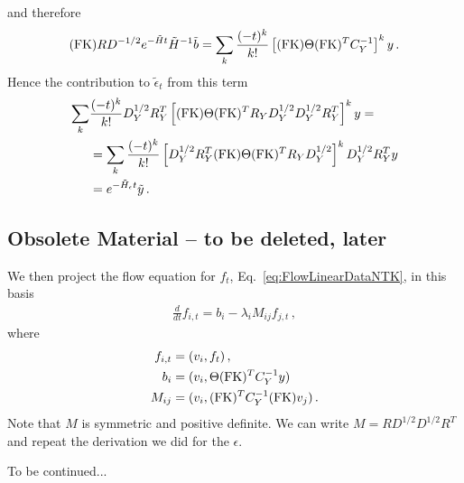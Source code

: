 \documentclass[11pt]{article}
\begin{document}
and therefore 
\begin{align}
    (\mathrm{FK}) R D^{-1/2} e^{-\tilde{H}t} \tilde{H}^{-1} \tilde{b} = 
        \sum_k \frac{(-t)^k}{k!} \left[(\mathrm{FK}) \Theta (\mathrm{FK})^T C_Y^{-1}\right]^k y\, .
\end{align}
Hence the contribution to $\tilde{\epsilon}_t$ from this term
\begin{align}
    \sum_k & \frac{(-t)^k}{k!} D_Y^{1/2} R_Y^T \left[(\mathrm{FK}) \Theta (\mathrm{FK})^T R_Y D_Y^{1/2} D_Y^{1/2} R_Y^T\right]^k y = \nonumber \\
        &= \sum_k \frac{(-t)^k}{k!} \left[D_Y^{1/2} R_Y^T (\mathrm{FK}) \Theta (\mathrm{FK})^T R_Y D_Y^{1/2} \right]^k D_Y^{1/2} R_Y^T y \nonumber \\
        &= e^{-\tilde{H}_\epsilon t} \tilde{y}\, .
\end{align}




\subsection*{Obsolete Material -- to be deleted, later}

We then project the flow equation for $f_t$, Eq.~\ref{eq:FlowLinearDataNTK}, in this basis
\begin{align}
    \label{eq:FlowEigenbasisNTK}
    \frac{d}{dt} f_{i,t} = b_i - \lambda_i M_{ij} f_{j,t}\, ,
\end{align} 
where
\begin{align}
    f_{i,t} &= (v_i, f_t)\, , \\
    b_i &= (v_i, \Theta (\mathrm{FK})^T C_Y^{-1} y)\, \\
    M_{ij} &= (v_i, (\mathrm{FK})^T C_Y^{-1} (\mathrm{FK}) v_j)\, .
\end{align}
Note that $M$ is symmetric and positive definite. We can write $M = R D^{1/2} D^{1/2} R^T$ and repeat the 
derivation we did for the $\epsilon$.

To be continued... 
\end{document}
